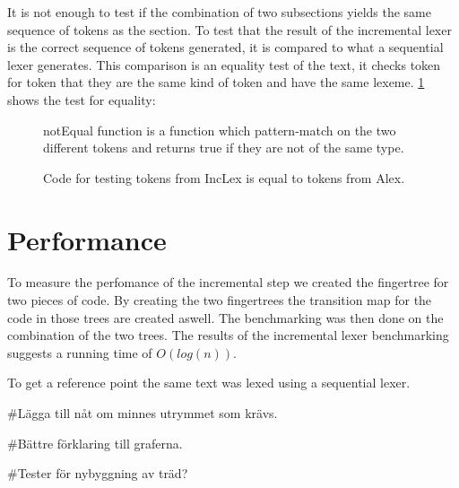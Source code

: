 It is not enough to test if the combination of two subsections yields the
same sequence of tokens as the section. To test that the result of the
incremental lexer is the correct sequence of tokens generated, it is compared to
what a sequential lexer generates. This comparison is an equality test of
the text, it checks token for token that they are the same kind of token and
have the same lexeme.
\cref{fig:CheckEquility} shows the test for equality:
\begin{figure}[h!]
  \centering
  
  notEqual function is a function which pattern-match on the two different
  tokens and returns true if they are not of the same type.
  \caption{Code for testing tokens from IncLex is equal to tokens from Alex. 
  \label{fig:CheckEquility}}
\end{figure} 

\section{Performance}
To measure the perfomance of the incremental step we created the fingertree for
two pieces of code. By creating the two fingertrees the transition map for the
code in those trees are created aswell. The benchmarking was then done on the
combination of the two trees. The results of the incremental lexer benchmarking
suggests a running time of $O(log(n))$.

To get a reference point the same text was lexed using a sequential lexer.

\#Lägga till nåt om minnes utrymmet som krävs.

\#Bättre förklaring till graferna.

\#Tester för nybyggning av träd?

